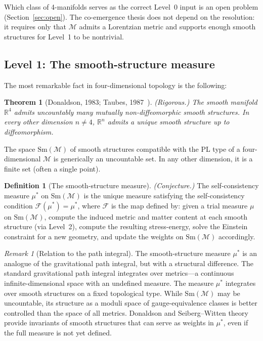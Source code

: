 \documentclass[12pt,a4paper]{article}
\newtheorem{theorem}{Theorem}
\theoremstyle{definition}
\newtheorem{definition}{Definition}
\theoremstyle{remark}
\newtheorem{remark}{Remark}
\begin{document}
Which class of 4-manifolds serves as the correct Level~0 input is an
open problem (Section~\ref{sec:open}). The co-emergence thesis does not
depend on the resolution: it requires only that $\mathcal{M}$ admits a
Lorentzian metric and supports enough smooth structures for Level~1 to
be nontrivial.

\subsection{Level 1: The smooth-structure measure}
\label{sec:level1}

The most remarkable fact in four-dimensional topology is the following:

\begin{theorem}[Donaldson, 1983; Taubes, 1987~\cite{donaldson,taubes}]
\emph{(Rigorous.)}
\label{thm:exotic}
The smooth manifold $\mathbb{R}^4$ admits uncountably many mutually
non-diffeomorphic smooth structures. In every other dimension $n \neq 4$,
$\mathbb{R}^n$ admits a unique smooth structure up to diffeomorphism.
\end{theorem}

The space $\mathrm{Sm}(\mathcal{M})$ of smooth structures compatible
with the PL type of a four-dimensional $\mathcal{M}$ is generically an
uncountable set. In any other dimension, it is a finite set (often a
single point).

\begin{definition}[The smooth-structure measure]
\emph{(Conjecture.)}
\label{def:mu}
The self-consistency measure $\mu^*$ on $\mathrm{Sm}(\mathcal{M})$ is
the unique measure satisfying the self-consistency condition
$\mathcal{F}(\mu^*) = \mu^*$, where $\mathcal{F}$ is the map defined
by: given a trial measure $\mu$ on $\mathrm{Sm}(\mathcal{M})$, compute
the induced metric and matter content at each smooth structure (via
Level~2), compute the resulting stress-energy, solve the Einstein
constraint for a new geometry, and update the weights on
$\mathrm{Sm}(\mathcal{M})$ accordingly.
\end{definition}

\begin{remark}[Relation to the path integral]
The smooth-structure measure $\mu^*$ is an analogue of the gravitational
path integral, but with a structural difference. The standard
gravitational path integral integrates over metrics---a continuous
infinite-dimensional space with an undefined measure. The measure $\mu^*$
integrates over smooth structures on a fixed topological type. While
$\mathrm{Sm}(\mathcal{M})$ may be uncountable, its structure as a moduli
space of gauge-equivalence classes is better controlled than the space of
all metrics. Donaldson and Seiberg--Witten theory provide invariants of
smooth structures that can serve as weights in $\mu^*$, even if the full
measure is not yet defined.
\end{remark}
\end{document}
